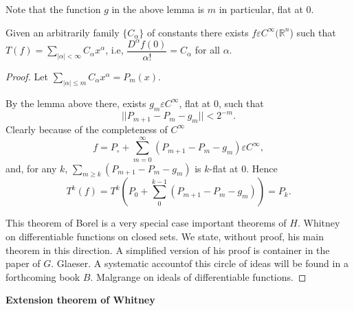 Note that the function $g$ in the above lemma is $m$ in particular,
flat at $0$.  

\setcounter{theorem}{0}
\begin{theorem}[E. Borel]\label{chap1:sec5:thm1}%
  Given an arbitrarily family $\{ C_\alpha\}$ of constants there
  exists $f \varepsilon C^\infty (\mathbb{R}^n$)  such that $T(f)
  =\sum\limits_{|\alpha | < \infty} C_\alpha x^\alpha$, i.e,
  $\dfrac{D^\alpha f(0)}{\alpha !}= C_\alpha$ for all $\alpha$. 
\end{theorem}

\begin{proof}%
  Let $\sum\limits_{ | \alpha | \leq m} C_\alpha x^\alpha = P_m (x)$.

  By the lemma above there, exists $g_m \varepsilon C^\infty$, flat at $0$,
  such that  
  $$
  || P_{ m+1} - P_m - g_m || < 2^{-m}.
  $$
  Clearly because of the completeness of  $C^\infty$
  $$
  f = P_\circ + \sum^\infty _{ m = 0} (P_{ m +1} - P_m - g_m) \varepsilon C^\infty,
  $$
  and, for any $k$, $\sum\limits_{ m \geq k} (P_ { m+1} - P_m - g_m) $
  is $k$-flat at $0$. Hence  
  $$
  T^k (f) = T^k \left( P_0 + \sum^{ k - 1}_0 ( P_{ m +1} - P_m -
  g_m)\right) = P_k.   
  $$  
  
  This theorem of Borel is a very special case important theorems of
  $H$. Whitney \cite{45} on differentiable functions on closed sets. We
  state, without proof, his main theorem in this direction. A
  simplified version of his proof is container in the paper \cite{12} of
  $G$. Glaeser. A systematic account\pageoriginale of this circle of ideas will be
  found in a forthcoming book $B$. Malgrange \cite{26} on ideals of
  differentiable functions.  
\end{proof}

\medskip
\noindent
\textbf{ Extension theorem of Whitney }

